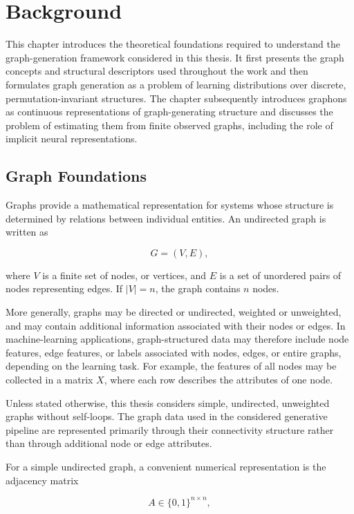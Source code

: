 \chapter{Background}
\label{chap:background}

This chapter introduces the theoretical foundations required to understand the graph-generation framework considered in this thesis. It first presents the graph concepts and structural descriptors used throughout the work and then formulates graph generation as a problem of learning distributions over discrete, permutation-invariant structures. The chapter subsequently introduces graphons as continuous representations of graph-generating structure and discusses the problem of estimating them from finite observed graphs, including the role of implicit neural representations.


\section{Graph Foundations}
\label{sec:basic_graph_theory}

Graphs provide a mathematical representation for systems whose structure is determined by relations between individual entities. An undirected graph is written as

\[
G=(V,E),
\]

where \(V\) is a finite set of nodes, or vertices, and \(E\) is a set of unordered pairs of nodes representing edges. If \(|V|=n\), the graph contains \(n\) nodes.

More generally, graphs may be directed or undirected, weighted or unweighted, and may contain additional information associated with their nodes or edges. In machine-learning applications, graph-structured data may therefore include node features, edge features, or labels associated with nodes, edges, or entire graphs, depending on the learning task. For example, the features of all nodes may be collected in a matrix \(X\), where each row describes the attributes of one node.

Unless stated otherwise, this thesis considers simple, undirected, unweighted graphs without self-loops. The graph data used in the considered generative pipeline are represented primarily through their connectivity structure rather than through additional node or edge attributes.

For a simple undirected graph, a convenient numerical representation is the adjacency matrix

\[
A\in\{0,1\}^{n\times n},
\]

